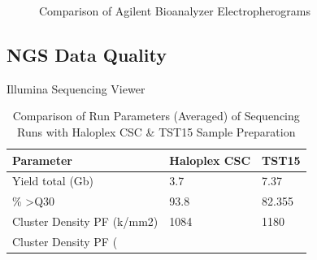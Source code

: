 \begin{figure}[!tbp]
  \centering
  \hfill
  \caption{Comparison of Agilent Bioanalyzer Electropherograms}
\end{figure}

\subsection{NGS Data Quality}

Illumina Sequencing Viewer

\begin{table}[!htbp]
    \caption[ISV]{Comparison of Run Parameters (Averaged) of Sequencing Runs with Haloplex CSC \& TST15 Sample Preparation}
    \centering
    \begin{tabular}{ |p{4cm}||p{4cm}||p{4cm}|}
    \hline
    Parameter & Haloplex CSC & TST15 \\ \hline \hline
    Yield total (Gb) & 3.7 & 7.37 \\ \hline
    \% \textgreater Q30 & 93.8 & 82.355 \\ \hline
    Cluster Density PF (k/mm2) & 1084 & 1180  \\ \hline
    Cluster Density PF (%
  \end{tabular}
\end{table}



